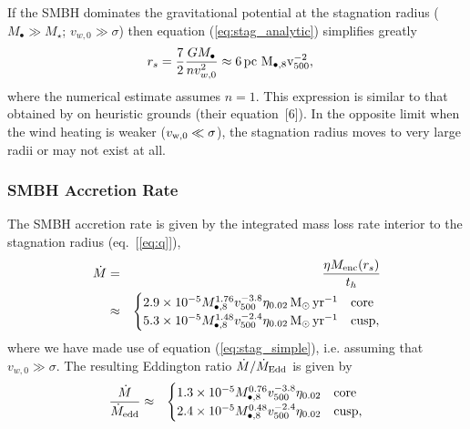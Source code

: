 \documentclass[usenatbib,fleqn]{mn2e}
\newcommand{\eddr}{\dot{M}/\dot{M}_{\rm Edd}}
\newcommand{\rs}{r_s}
\newcommand{\pc}{\rm pc}
\newcommand{\Menc}{M_{\rm enc}}
\newcommand{\Mbh}[1][]{M_{\bullet#1}}
\newcommand{\Mbheight}{M_{\bullet,8}}
\newcommand{\vwO}{v_{w,0}}
\newcommand{\pyear}{{\rm yr}^{-1}}
\renewcommand{\th}{t_h}
\begin{document}
If the SMBH dominates the gravitational potential at the stagnation radius ($M_{\bullet} \gg M_{\star}$; $v_{w,0} \gg \sigma$) then equation (\ref{eq:stag_analytic}) simplifies greatly
\begin{align}
  &\rs=\frac{7}{2}\frac{G \Mbh}{n \vwO^2} \approx 6
 \, \pc \,\, \Mbheight v_{500}^{-2},
  \label{eq:stag_simple}
\end{align}
where the numerical estimate assumes $n = 1$.  This expression is similar to that obtained by \citet{Volonteri+11} on heuristic grounds (their equation~[6]).  In the opposite limit when the wind heating is weaker ($v_{\rm w,0} \ll \sigma$), the stagnation radius moves to very large radii or may not exist at all.  

\subsubsection{SMBH Accretion Rate}

The SMBH accretion rate is given by the integrated mass loss rate interior to the stagnation radius (eq.~[\ref{eq:q}]), 
\begin{eqnarray}
  \dot{M} &=& \frac{\eta \Menc(\rs)}{\th} \nonumber \\
&\approx&
  \begin{cases}
    2.9 \times 10^{-5} M_{\bullet,8}^{1.76}
    v_{500}^{-3.8}  \eta_{0.02} \Msun \, \pyear& \text{core} \\
    5.3 \times 10^{-5} M_{\bullet,8}^{1.48} 
    v_{500}^{-2.4}  \eta_{0.02} \Msun \, \pyear  & \text{cusp}, 
  \end{cases}
  \label{eq:mdot_analytic}
\end{eqnarray}
where we have made use of equation (\ref{eq:stag_simple}), i.e. assuming that $v_{w,0} \gg \sigma$.  The resulting Eddington ratio $\eddr$ is given by 
\begin{eqnarray}
\frac{\dot{M}}{\dot{M}_{\rm edd}} &\approx&
  \begin{cases}
    1.3 \times 10^{-5} M_{\bullet,8}^{0.76}
    v_{500}^{-3.8}  \eta_{0.02}   & \text{core} \\
    2.4 \times 10^{-5} \Mbheight^{0.48} 
    v_{500}^{-2.4}  \eta_{0.02}   & \text{cusp}, 
  \end{cases}
  \label{eq:eddr_analytic}
\end{eqnarray}
\end{document}

